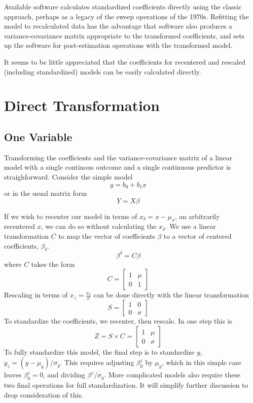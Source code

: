 \documentclass[]{article}
\begin{document}
Available software calculates standardized coefficients directly using
the classic approach, perhaps as a legacy of the sweep operations of the
1970s. Refitting the model to recalculated data has the advantage that
software also produces a variance-covariance matrix appropriate to the
transformed coefficients, and sets up the software for post-estimation
operations with the transformed model.

It seems to be little appreciated that the coefficients for recentered
and rescaled (including standardized) models can be easily calculated
directly.

\hypertarget{direct-transformation}{%
\section{Direct Transformation}\label{direct-transformation}}

\hypertarget{one-variable}{%
\subsection{One Variable}\label{one-variable}}

Transforming the coefficients and the variance-covariance matrix of a
linear model with a single continous outcome and a single continuous
predictor is straighforward. Consider the simple model
\[y = b_0 + b_1x\] or in the usual matrix form \[Y=X\beta\]

If we wish to recenter our model in terms of \(x_\delta=x-\mu_x\), an
arbitrarily recentered \(x\), we can do so without calculating the
\(x_\delta\). We use a linear transformation \(C\) to map the vector of
coefficients \(\beta\) to a vector of centered coefficients,
\(\beta_\delta\). \[\beta^\delta=C\beta\] where \(C\) takes the form
\[C=\begin{bmatrix}1 & \mu \\ 0 & 1 \end{bmatrix}\] Rescaling in terms
of \(x_z=\frac{x_\delta}{\sigma}\) can be done directly with the linear
transformation \[S=\begin{bmatrix}1 & 0 \\ 0 & \sigma \end{bmatrix}\] To
standardize the coefficients, we recenter, then rescale. In one step
this is
\[Z = S \times C =\begin{bmatrix}1 & \mu \\ 0 & \sigma \end{bmatrix}\]
To fully standardize this model, the final step is to standardize \(y\),
\(y_z=(y-\mu_y)/\sigma_y\). This requires adjusting \(\beta_0^z\) by
\(\mu_y\), which in this simple case leaves \(\beta_0^z=0\), and
dividing \(\beta^z/\sigma_y\). More complicated models also require
these two final operations for full standardization. It will simplify
further discussion to drop consideration of this.
\end{document}
